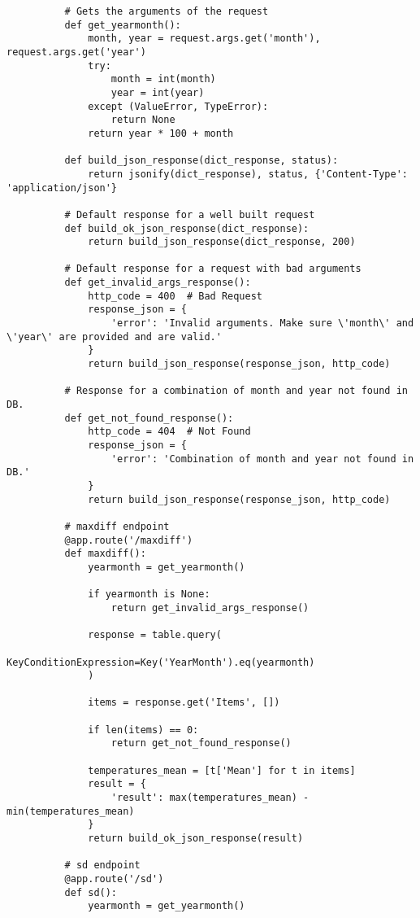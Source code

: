 \begin{verbatim}
          # Gets the arguments of the request
          def get_yearmonth():
              month, year = request.args.get('month'), request.args.get('year')
              try:
                  month = int(month)
                  year = int(year)
              except (ValueError, TypeError):
                  return None
              return year * 100 + month

          def build_json_response(dict_response, status):
              return jsonify(dict_response), status, {'Content-Type': 'application/json'}

          # Default response for a well built request
          def build_ok_json_response(dict_response):
              return build_json_response(dict_response, 200)

          # Default response for a request with bad arguments
          def get_invalid_args_response():
              http_code = 400  # Bad Request
              response_json = {
                  'error': 'Invalid arguments. Make sure \'month\' and \'year\' are provided and are valid.'
              }
              return build_json_response(response_json, http_code)

          # Response for a combination of month and year not found in DB.
          def get_not_found_response():
              http_code = 404  # Not Found
              response_json = {
                  'error': 'Combination of month and year not found in DB.'
              }
              return build_json_response(response_json, http_code)

          # maxdiff endpoint
          @app.route('/maxdiff')
          def maxdiff():
              yearmonth = get_yearmonth()

              if yearmonth is None:
                  return get_invalid_args_response()

              response = table.query(
                  KeyConditionExpression=Key('YearMonth').eq(yearmonth)
              )

              items = response.get('Items', [])

              if len(items) == 0:
                  return get_not_found_response()

              temperatures_mean = [t['Mean'] for t in items]
              result = {
                  'result': max(temperatures_mean) - min(temperatures_mean)
              }
              return build_ok_json_response(result)

          # sd endpoint
          @app.route('/sd')
          def sd():
              yearmonth = get_yearmonth()


\end{verbatim}

